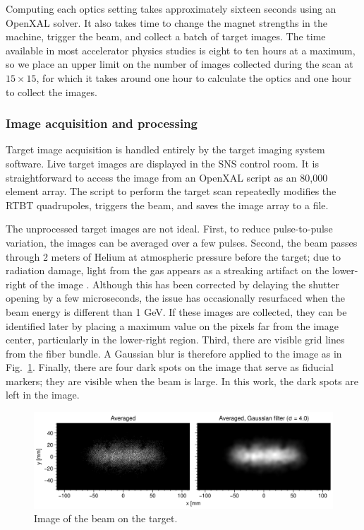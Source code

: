 %
Computing each optics setting takes approximately sixteen seconds using an OpenXAL solver. It also takes time to change the magnet strengths in the machine, trigger the beam, and collect a batch of target images. The time available in most accelerator physics studies is eight to ten hours at a maximum, so we place an upper limit on the number of images collected during the scan at $15 \times 15$, for which it takes around one hour to calculate the optics and one hour to collect the images. 


\subsubsection{Image acquisition and processing}

Target image acquisition is handled entirely by the target imaging system software. Live target images are displayed in the SNS control room. It is straightforward to access the image from an OpenXAL script as an 80,000 element array. The script to perform the target scan repeatedly modifies the RTBT quadrupoles, triggers the beam, and saves the image array to a file.

The unprocessed target images are not ideal. First, to reduce pulse-to-pulse variation, the images can be averaged over a few pulses. Second, the beam passes through 2 meters of Helium at atmospheric pressure before the target; due to radiation damage, light from the gas appears as a streaking artifact on the lower-right of the image \cite{Blokland2010}. Although this has been corrected by delaying the shutter opening by a few microseconds, the issue has occasionally resurfaced when the beam energy is different than 1 GeV. If these images are collected, they can be identified later by placing a maximum value on the pixels far from the image center, particularly in the lower-right region. Third, there are visible grid lines from the fiber bundle. A Gaussian blur is therefore applied to the image as in Fig.~\ref{fig:target_image}. Finally, there are four dark spots on the image that serve as fiducial markers; they are visible when the beam is large. In this work, the dark spots are left in the image.
%
\begin{figure}[!p]
    \centering
    \vspace*{5cm}
    \includegraphics[width=1.0\textwidth]{Images/chapter4/target_image.png}
    \caption{Image of the beam on the target.}
    \label{fig:target_image}
     \vspace*{5cm}
\end{figure}
%


